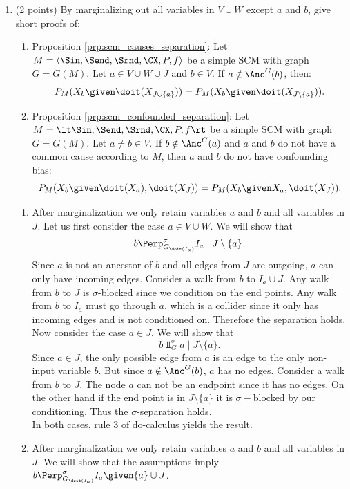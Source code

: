 \begin{enumerate}
\item (2 points) By marginalizing out all variables in $V \cup W$ except $a$ and $b$, give short proofs of:
\begin{enumerate}
	\item Proposition \ref*{prp:scm_causes_separation}: Let $M = \langle \Sin, \Send, \Srnd, \CX, P, f \rangle$ be a simple SCM with graph $G = G(M)$.
	Let $a \in V \cup W \cup J$ and $b \in V$.
	If $a \notin \Anc^G(b)$, then:
	$$P_{M}(X_b \given \doit(X_{J\cup \{a\}})) = P_{M}(X_b \given \doit(X_{J\setminus \{a\}})).$$
	\item Proposition \ref*{prp:scm_confounded_separation}:  Let $M = \lt \Sin, \Send, \Srnd, \CX, P, f \rt$ be a simple SCM with graph $G = G(M)$.
	Let $a \ne b \in V$.
	If $b \notin \Anc^G(a)$ and $a$ and $b$ do not have a common cause according to $M$, then
	$a$ and $b$ do not have confounding bias:
	$$P_{M}(X_b \given \doit(X_a), \doit(X_J)) = P_{M}(X_b \given X_a, \doit(X_J)).$$
\end{enumerate}

\begin{gradedsolution}
\begin{enumerate}
	\item After marginalization we only retain variables $a$ and $b$ and all variables in $J$. Let us first consider the case $a \in V \cup W$. We will show that 
	$$b \Perp^\sigma_{G_{\doit(I_a)}} I_a \mid J \setminus \{a\}.$$
	Since $a$ is not an ancestor of $b$ and all edges from $J$ are outgoing, $a$ can only have incoming edges. Consider a walk from $b$ to $I_a \cup J$. Any walk from $b$ to $J$ is $\sigma$-blocked since we condition on the end points. Any walk from $b$ to $I_a$ must go through $a$, which is a collider since it only has incoming edges and is not conditioned on. Therefore the separation holds.
	Now consider the case $a \in J$. We will show that
	$$b \Perp^\sigma_{G} a \mid J \setminus \{a\}.$$
	Since $a \in J$, the only possible edge from $a$ is an edge to the only non-input variable $b$. But since $a \notin \Anc^G(b)$, $a$ has no edges. Consider a walk from $b$ to $J$. The node $a$ can not be an endpoint since it has no edges. On the other hand if the end point is in $J \setminus \{a\}$ it is $\sigma-$blocked by our conditioning. Thus the $\sigma$-separation holds.\\
	In both cases, rule 3 of do-calculus yields the result.
	\item After marginalization we only retain variables $a$ and $b$ and all variables in $J$. We will show that the assumptions imply $b \Perp^\sigma_{G_{\doit(I_a)}} I_a \given \{a\} \cup J$.
	

\end{enumerate}
\end{gradedsolution}
\end{enumerate}
